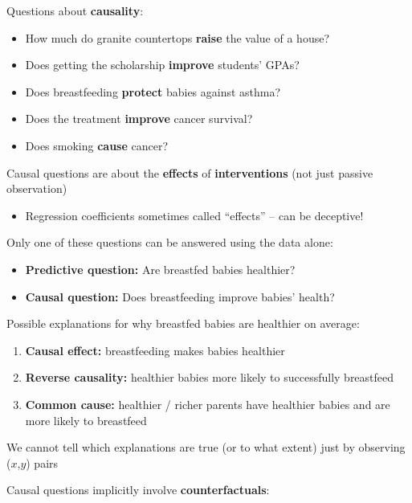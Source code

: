 \documentclass[
  letterpaper,
  DIV=11,
  numbers=noendperiod]{scrreprt}
\providecommand{\tightlist}{%
  \setlength{\itemsep}{0pt}\setlength{\parskip}{0pt}}\usepackage{longtable,booktabs,array}
\begin{document}
Questions about \textbf{causality}:

\begin{itemize}
\tightlist
\item
  How much do granite countertops \textbf{raise} the value of a house?
\item
  Does getting the scholarship \textbf{improve} students' GPAs?
\item
  Does breastfeeding \textbf{protect} babies against asthma?
\item
  Does the treatment \textbf{improve} cancer survival?
\item
  Does smoking \textbf{cause} cancer?
\end{itemize}

Causal questions are about the \textbf{effects} of
\textbf{interventions} (not just passive observation)

\begin{itemize}
\tightlist
\item
  Regression coefficients sometimes called ``effects'' -- can be
  deceptive!
\end{itemize}

Only one of these questions can be answered using the data alone:

\begin{itemize}
\tightlist
\item
  \textbf{Predictive question:} Are breastfed babies healthier?
\item
  \textbf{Causal question:} Does breastfeeding improve babies' health?
\end{itemize}

Possible explanations for why breastfed babies are healthier on average:

\begin{enumerate}
\def\labelenumi{\arabic{enumi}.}
\tightlist
\item
  \textbf{Causal effect:} breastfeeding makes babies healthier
\item
  \textbf{Reverse causality:} healthier babies more likely to
  successfully breastfeed
\item
  \textbf{Common cause:} healthier / richer parents have healthier
  babies and are more likely to breastfeed
\end{enumerate}

We cannot tell which explanations are true (or to what extent) just by
observing (\(x\),\(y\)) pairs

Causal questions implicitly involve \textbf{counterfactuals}:
\end{document}
